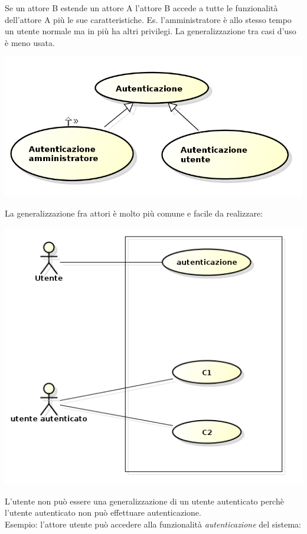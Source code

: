 Se un attore B estende un attore A l'attore B accede a tutte le funzionalità dell'attore A più le sue caratteristiche. Es. l'amministratore è allo stesso tempo un utente normale ma in più ha altri privilegi. La generalizzazione tra casi d'uso è meno usata.

\begin{center}

\includegraphics[width=0.75\columnwidth]{img2} %

\end{center}

La generalizzazione fra attori è molto più comune e facile da realizzare:

\begin{center}

\includegraphics[width=0.75\columnwidth]{img3} %

\end{center}

L'utente non può essere una generalizzazione di un utente autenticato perchè l'utente autenticato non può effettuare autenticazione.\\
Esempio: l'attore utente può accedere alla funzionalità \textit{autenticazione} del sistema:

